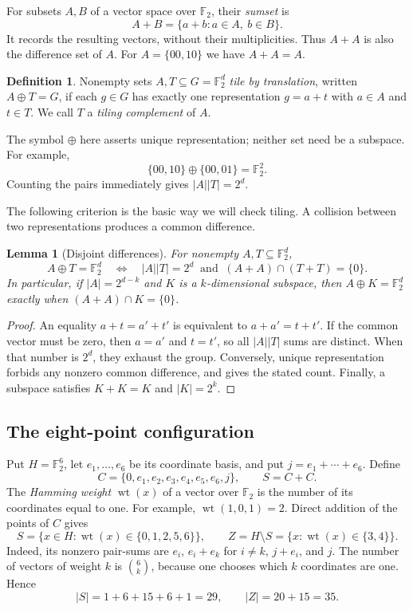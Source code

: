 \documentclass[11pt]{article}
\numberwithin{equation}{section}
\newtheorem{lemma}[theorem]{Lemma}
\theoremstyle{definition}
\newtheorem{definition}[theorem]{Definition}
\theoremstyle{remark}\newtheorem{remark}[theorem]{Remark}
\newcommand{\F}{\mathbb F_2}
\newcommand{\wt}{\operatorname{wt}}
\begin{document}
For subsets $A,B$ of a vector space over $\F$, their \emph{sumset} is
\[
 A+B=\{a+b:a\in A,\ b\in B\}.
\]
It records the resulting vectors, without their multiplicities. Thus $A+A$ is also the difference set of $A$. For $A=\{00,10\}$ we have $A+A=A$.

\begin{definition}
Nonempty sets $A,T\subseteq G=\F^d$ \emph{tile by translation}, written $A\oplus T=G$, if each $g\in G$ has exactly one representation $g=a+t$ with $a\in A$ and $t\in T$. We call $T$ a \emph{tiling complement} of $A$.
\end{definition}
The symbol $\oplus$ here asserts unique representation; neither set need be a subspace. For example,
\[
 \{00,10\}\oplus\{00,01\}=\F^2.
\]
Counting the pairs immediately gives $|A||T|=2^d$.

The following criterion is the basic way we will check tiling. A collision between two representations produces a common difference.
\begin{lemma}[Disjoint differences]\label{lem:tiling}
For nonempty $A,T\subseteq\F^d$,
\[
 A\oplus T=\F^d
 \quad\Longleftrightarrow\quad
 |A||T|=2^d\ \text{ and }\ (A+A)\cap(T+T)=\{0\}.
\]
In particular, if $|A|=2^{d-k}$ and $K$ is a $k$-dimensional subspace, then $A\oplus K=\F^d$ exactly when $(A+A)\cap K=\{0\}$.
\end{lemma}
\begin{proof}
An equality $a+t=a'+t'$ is equivalent to $a+a'=t+t'$. If the common vector must be zero, then $a=a'$ and $t=t'$, so all $|A||T|$ sums are distinct. When that number is $2^d$, they exhaust the group. Conversely, unique representation forbids any nonzero common difference, and gives the stated count. Finally, a subspace satisfies $K+K=K$ and $|K|=2^k$.
\end{proof}

\subsection{The eight-point configuration}
Put $H=\F^6$, let $e_1,\ldots,e_6$ be its coordinate basis, and put $j=e_1+\cdots+e_6$. Define
\begin{equation}\label{eq:C}
 C=\{0,e_1,e_2,e_3,e_4,e_5,e_6,j\},\qquad S=C+C.
\end{equation}
The \emph{Hamming weight} $\wt(x)$ of a vector over $\F$ is the number of its coordinates equal to one. For example, $\wt(1,0,1)=2$. Direct addition of the points of $C$ gives
\begin{equation}\label{eq:SZ}
 S=\{x\in H:\wt(x)\in\{0,1,2,5,6\}\},\qquad
 Z=H\setminus S=\{x:\wt(x)\in\{3,4\}\}.
\end{equation}
Indeed, its nonzero pair-sums are $e_i$, $e_i+e_k$ for $i\ne k$, $j+e_i$, and $j$. The number of vectors of weight $k$ is $\binom6k$, because one chooses which $k$ coordinates are one. Hence
\[
 |S|=1+6+15+6+1=29,\qquad |Z|=20+15=35.
\]
\end{document}
